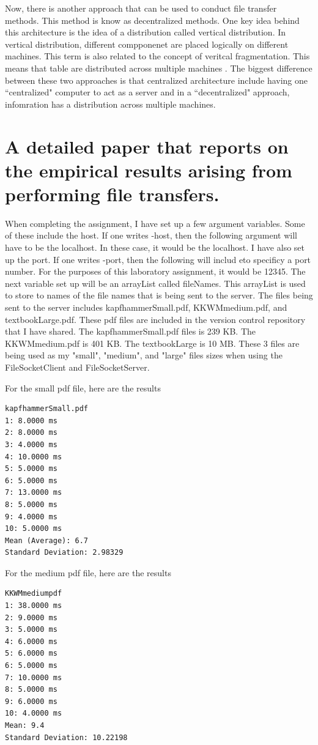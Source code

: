 \documentclass{article}
\begin{document}
\par
Now, there is another approach that can be used to conduct file transfer methods. This method is know as decentralized methods. One key idea behind this architecture is the idea of a distribution called vertical distribution. In vertical distribution, different compponenet are placed logically on different machines. This term is also related to the concept of veritcal fragmentation. This means that table are distributed across multiple machines \cite{tanenbaum_steen_2007}. The biggest difference between these two approaches is that centralized architecture include having one ``centralized" computer to act as a server and in a ``decentralized" approach, infomration has a distribution across multiple machines. 


\section{A detailed paper that reports on the empirical results arising from performing file transfers.}

When completing the assignment, I have set up a few argument variables. Some of these include the host. If one writes -host, then the following argument will have to be the localhost. In these case, it would be the localhost. I have also set up the port. If one writes -port, then the following will includ eto specificy a port number. For the purposes of this laboratory assignment, it would be 12345. The next variable set up will be an arrayList called fileNames. This arrayList is used to store to names of the file names that is being sent to the server. The files being sent to the server includes kapfhammerSmall.pdf, KKWMmedium.pdf, and textbookLarge.pdf. These pdf files are included in the version control repository that I have shared. The kapfhammerSmall.pdf files is 239 KB. The KKWMmedium.pdf is 401 KB. The textbookLarge is 10 MB. These 3 files are being used as my "small", "medium", and "large"
files sizes when using the FileSocketClient and FileSocketServer.     
\par
For the small pdf file, here are the results
\begin{lstlisting}
kapfhammerSmall.pdf
1: 8.0000 ms
2: 8.0000 ms
3: 4.0000 ms
4: 10.0000 ms
5: 5.0000 ms
6: 5.0000 ms
7: 13.0000 ms
8: 5.0000 ms
9: 4.0000 ms
10: 5.0000 ms
Mean (Average): 6.7
Standard Deviation: 2.98329
\end{lstlisting}
For the medium pdf file, here are the results
\begin{lstlisting}
KKWMmediumpdf
1: 38.0000 ms
2: 9.0000 ms
3: 5.0000 ms
4: 6.0000 ms
5: 6.0000 ms
6: 5.0000 ms
7: 10.0000 ms
8: 5.0000 ms
9: 6.0000 ms
10: 4.0000 ms
Mean: 9.4
Standard Deviation: 10.22198
\end{lstlisting}
\end{document}
